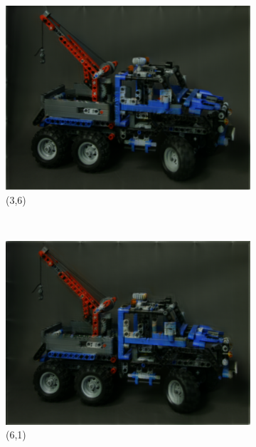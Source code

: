 \documentclass[11pt,a4paper,titlepage]{article}
\begin{document}
\begin{figure}
\begin{subfigure}[t]{0.31\textwidth}
		\includegraphics[width=\textwidth]{results/tiles_legotruck_6x6x480x640_480x640x5_tiling_4x6x200x200_overlap_0.5/Reconstruction_of_view_(3,6).png}
		\caption{(3,6)}
	\end{subfigure}%
	\\
	\begin{subfigure}[t]{0.31\textwidth}
		\includegraphics[width=\textwidth]{results/tiles_legotruck_6x6x480x640_480x640x5_tiling_4x6x200x200_overlap_0.5/Reconstruction_of_view_(6,1).png}
		\caption{(6,1)}
	\end{subfigure}%
	~
	\begin{subfigure}[t]{0.31\textwidth}

\end{subfigure}
\end{figure}
\end{document}
